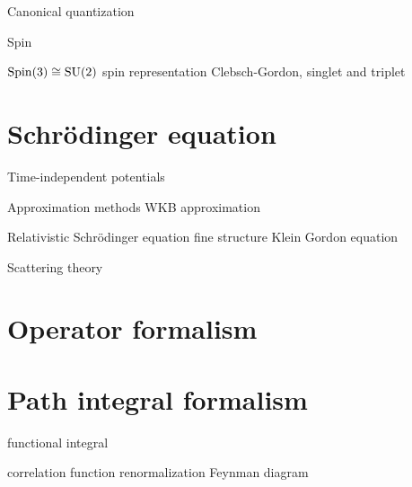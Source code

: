 \documentclass{../../large}
\begin{document}
Canonical quantization
\begin{prb}
\end{prb}
\begin{prb}
\end{prb}
\begin{prb}
\end{prb}

Spin
\begin{prb}
\end{prb}

$\mathrm{Spin}(3)\cong\mathrm{SU}(2)$
spin representation
Clebsch-Gordon, singlet and triplet



\section{Schr\"odinger equation}

Time-independent potentials

\begin{prb}
\end{prb}
\begin{prb}
\end{prb}
\begin{prb}
\end{prb}
\begin{prb}
\end{prb}
\begin{prb}
\end{prb}

Approximation methods
WKB approximation

Relativistic Schr\"odinger equation
fine structure
Klein Gordon equation

Scattering theory



\section{Operator formalism}
\section{Path integral formalism}
functional integral

correlation function
renormalization
Feynman diagram
\end{document}

